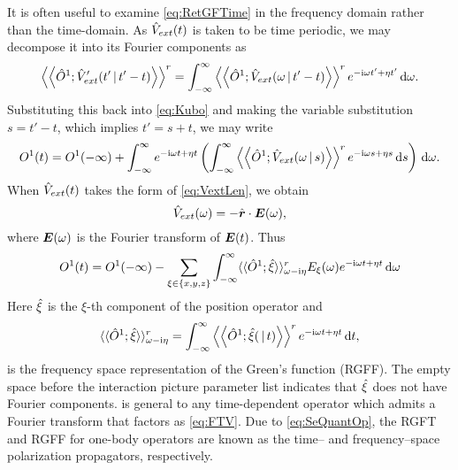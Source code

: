 It is often useful to examine \cref{eq:RetGFTime} in the frequency domain rather than the time-domain. As $\hat{V}_{ext}(t)$ is
taken to be time periodic, we may decompose it into its Fourier components as
\begin{equation}
  \left \langle \left \langle \hat{O}^1; \hat{V}'_{ext}(t' \,\vert\, t'-t) \right\rangle \right\rangle^r = \int_{-\infty}^\infty \left \langle \left \langle \hat{O}^1; \hat{V}_{ext}(\omega \,\vert\, t'-t) \right\rangle \right\rangle^r e^{-\mathrm i \omega t' + \eta t'}\,\mathrm{d}\omega.
\end{equation}
Substituting this back into \cref{eq:Kubo} and making the variable substitution $s = t' - t$, which implies $t' = s + t$, we may write
\begin{equation}
O^1(t) = O^1(-\infty) +\int_{-\infty}^\infty  e^{-\mathrm i \omega t + \eta t} \left(\int_{-\infty}^\infty \left \langle \left \langle \hat{O}^1; \hat{V}_{ext}(\omega \,\vert\, s) \right\rangle \right\rangle^r 
e^{-\mathrm i \omega s + \eta s} \,\mathrm{d} s\right)
\,\mathrm{d} \omega.
\end{equation}
When $\hat{V}_{ext}(t)$ takes the form of \cref{eq:VextLen}, we obtain 
\begin{equation}
\label{eq:FTV}
\hat{V}_{ext}(\omega) = -\hat{\boldsymbol{r}} \cdot \boldsymbol{E}(\omega),
\end{equation}
where $\boldsymbol{E}(\omega)$ is the Fourier transform of $\boldsymbol{E}(t)$. Thus
\begin{equation}
\label{eq:FTResponse}
O^1(t) = O^1(-\infty) - \sum_{\xi \in \{x,y,z\}} \int_{-\infty}^\infty \langle \langle \hat{O}^1; \hat{\xi} \rangle \rangle^r_{\omega - \mathrm i\eta} E_\xi(\omega) e^{-\mathrm i\omega t + \eta t} \,\mathrm{d}\omega 
\end{equation}
Here $\hat{\xi}$ is the $\xi$-th component of the position operator and
\begin{equation}
\label{eq:RetGFFT}
\langle \langle \hat{O}^1; \hat{\xi} \rangle \rangle^r_{\omega - \mathrm i\eta} = \int_{-\infty}^\infty \left \langle \left \langle \hat{O}^1; \hat{\xi} ( \,\vert\, t) \right\rangle \right\rangle^r e^{-\mathrm i \omega t + \eta t} \,\mathrm{d} t,
\end{equation}
is the frequency space representation of the Green's function (RGFF).
The empty space before the interaction picture parameter list indicates that $\hat{\xi}$ does not have Fourier components.  is general
to any time-dependent operator which admits a Fourier transform that factors as \cref{eq:FTV}.
Due to \cref{eq:SeQuantOp}, the RGFT and RGFF for one-body operators are known as the time-- and frequency--space
polarization propagators, respectively.

